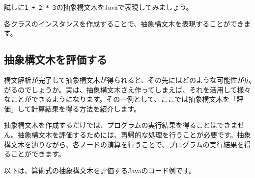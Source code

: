 試しに\texttt{1\ +\ 2\ *\ 3}の抽象構文木をJavaで表現してみましょう。

\begin{Shaded}
\begin{Highlighting}[]
 \NormalTok{(}
   \NormalTok{(}\NormalTok{), } \NormalTok{(} \NormalTok{(}\NormalTok{), } \NormalTok{(}\NormalTok{))}
\NormalTok{);}
\end{Highlighting}
\end{Shaded}

各クラスのインスタンスを作成することで、抽象構文木を表現することができます。

\hypertarget{chapter2-ux62bdux8c61ux69cbux6587ux6728ux3092ux8a55ux4fa1ux3059ux308b}{%
\subsection{抽象構文木を評価する}\label{chapter2-ux62bdux8c61ux69cbux6587ux6728ux3092ux8a55ux4fa1ux3059ux308b}}

構文解析が完了して抽象構文木が得られると、その先にはどのような可能性が広がるのでしょうか。実は、抽象構文木さえ作ってしまえば、それを活用して様々なことができるようになります。その一例として、ここでは抽象構文木を「評価」して計算結果を得る方法を紹介します。

抽象構文木を作成するだけでは、プログラムの実行結果を得ることはできません。抽象構文木を評価するためには、再帰的な処理を行うことが必要です。抽象構文木を辿りながら、各ノードの演算を行うことで、プログラムの実行結果を得ることができます。

以下は、算術式の抽象構文木を評価するJavaのコード例です。

